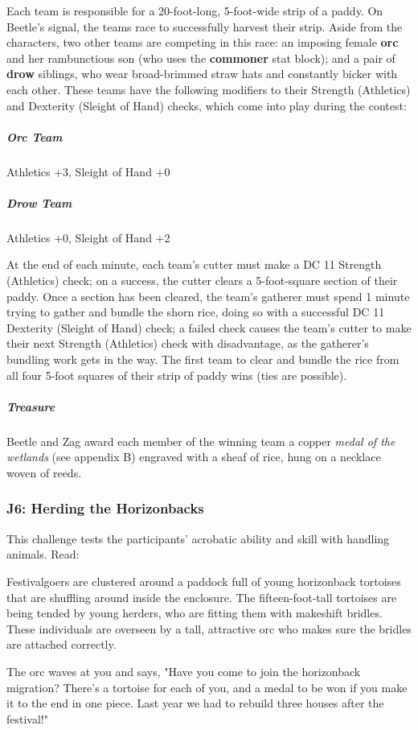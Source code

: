 \documentclass[10pt,a4paper,twoside,fancy,bg=print,twocolumn,openany,nodeprecatedcode]{dndbook}
\begin{document}
Each team is responsible for a 20-foot-long, 5-foot-wide strip of a paddy. On Beetle's signal, the teams race to successfully harvest their strip. Aside from the characters, two other teams are competing in this race: an imposing female \textbf{orc} and her rambunctious son (who uses the \textbf{commoner} stat block); and a pair of \textbf{drow} siblings, who wear broad-brimmed straw hats and constantly bicker with each other. These teams have the following modifiers to their Strength (Athletics) and Dexterity (Sleight of Hand) checks, which come into play during the contest:

\subparagraph{Orc Team}
Athletics +3, Sleight of Hand +0

\subparagraph{Drow Team}
Athletics +0, Sleight of Hand +2

At the end of each minute, each team's cutter must make a DC 11 Strength (Athletics) check; on a success, the cutter clears a 5-foot-square section of their paddy. Once a section has been cleared, the team's gatherer must spend 1 minute trying to gather and bundle the shorn rice, doing so with a successful DC 11 Dexterity (Sleight of Hand) check; a failed check causes the team's cutter to make their next Strength (Athletics) check with disadvantage, as the gatherer's bundling work gets in the way. The first team to clear and bundle the rice from all four 5-foot squares of their strip of paddy wins (ties are possible).

\subparagraph{Treasure}
Beetle and Zag award each member of the winning team a copper \textit{medal of the wetlands} (see appendix B) engraved with a sheaf of rice, hung on a necklace woven of reeds.

\subsubsection{J6: Herding the Horizonbacks}
This challenge tests the participants' acrobatic ability and skill with handling animals. Read:

\begin{DndReadAloud}{}
Festivalgoers are clustered around a paddock full of young horizonback tortoises that are shuffling around inside the enclosure. The fifteen-foot-tall tortoises are being tended by young herders, who are fitting them with makeshift bridles. These individuals are overseen by a tall, attractive orc who makes sure the bridles are attached correctly.

The orc waves at you and says, "Have you come to join the horizonback migration? There's a tortoise for each of you, and a medal to be won if you make it to the end in one piece. Last year we had to rebuild three houses after the festival!"

\end{DndReadAloud}
\end{document}
